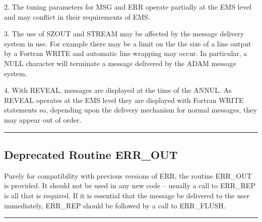 \documentclass[twoside,11pt]{starlink}
\begin{document}
\begin {small}
{{      2. The tuning parameters for MSG and ERR operate partially at the EMS
        level and may conflict in their requirements of EMS.

      3. The use of SZOUT and STREAM may be affected by the message delivery
        system in use. For example there may be a limit on the the size of a
        line output by a Fortran WRITE and automatic line wrapping may occur.
        In particular, a NULL character will terminate a message delivered by
        the ADAM message system.

      4. With REVEAL, messages are displayed at the time of the ANNUL.
        As REVEAL operates at the EMS level they are displayed with Fortran
        WRITE statements so, depending upon the delivery mechanism for
        normal messages, they may appear out of order.
   }
}
\end {small}
\rule{\textwidth}{0.5mm}

\subsection{Deprecated Routine ERR\_OUT \label{out_sect}}
Purely for compatibility with previous versions of ERR, the routine
ERR\_OUT is provided. It should not be used in any new code -- usually a
call to ERR\_REP is all that is required. If it is essential that the message
be delivered to the user immediately, ERR\_REP should be followed by a call to
ERR\_FLUSH.

\begin {small}
\end{small}
\rule{\textwidth}{0.5mm}
\end{document}
